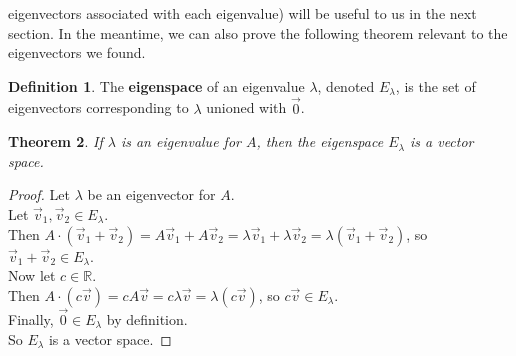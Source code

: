 \documentclass[11pt]{amsart}
\newtheorem{theorem}{Theorem}[section]
\theoremstyle{definition}
\newtheorem{definition}[theorem]{Definition}
\newcommand{\reals}{\mathbb{R}}
\begin{document}
eigenvectors associated with each eigenvalue) will be useful to us in the next section. In the meantime, we can also prove the following theorem
relevant to the eigenvectors we found.
\newpage
\begin{definition}
	The \textbf{eigenspace} of an eigenvalue $\lambda$, denoted $E_\lambda$, is the set of eigenvectors corresponding to $\lambda$ 
	unioned with $\vec{0}$.
\end{definition}
\begin{theorem}
	If $\lambda$ is an eigenvalue for $A$, then the eigenspace $E_\lambda$ is a vector space.
\end{theorem}
\begin{proof}
	Let $\lambda$ be an eigenvector for $A$. \\
	Let $\vec{v}_1, \vec{v}_2 \in E_\lambda$. \\
	Then $A \cdot (\vec{v}_1 + \vec{v}_2) = A\vec{v}_1 + A\vec{v}_2 = \lambda\vec{v}_1 + \lambda\vec{v}_2 = \lambda(\vec{v}_1 + \vec{v}_2)$,
	so $\vec{v}_1 + \vec{v}_2 \in E_\lambda$. \\
	Now let $c \in \reals$. \\
	Then $A \cdot (c \vec{v}) = c A\vec{v} = c \lambda \vec{v} = \lambda (c \vec{v})$, so $c\vec{v} \in E_\lambda$. \\
	Finally, $\vec{0} \in E_\lambda$ by definition. \\
	So $E_\lambda$ is a vector space.
\end{proof}

\newpage
\end{document}
